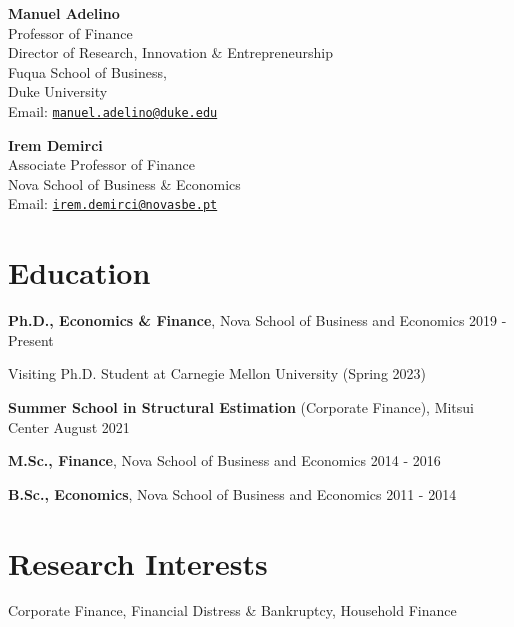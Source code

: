 \documentclass[letterpaper]{article}
\newenvironment{itemize*}{
  \begin{list}{}{
    \setlength{\leftmargin}{1.5em}
  }
}{
  \end{list}
}
\begin{document}
\begin{multicols}{2}
\textbf{Manuel Adelino} \\
Professor of Finance \\
Director of Research, Innovation \& Entrepreneurship \\
Fuqua School of Business, \\ 
Duke University \\
Email: \href{mailto:manuel.adelino@duke.edu}{\tt manuel.adelino@duke.edu} 
\columnbreak \hfill

\textbf{Irem Demirci} \\
Associate Professor of Finance \\ 
Nova School of Business \& Economics \\
Email: \href{mailto:irem.demirci@novasbe.pt}{\tt irem.demirci@novasbe.pt} 
\end{multicols}

\section*{Education}
\vspace{-0.2in}
\hrulefill
\begin{itemize*}
\item \textbf{Ph.D., Economics \& Finance}, Nova School of Business and Economics \hfill 2019 - Present
\item \phantom{aaa} Visiting Ph.D. Student at Carnegie Mellon University (Spring 2023)
\item \textbf{Summer School in Structural Estimation} (Corporate Finance), Mitsui Center \hfill August 2021
\item \textbf{M.Sc., Finance}, Nova School of Business and Economics \hfill 2014 - 2016
\item \textbf{B.Sc., Economics}, Nova School of Business and Economics \hfill  2011 - 2014
\end{itemize*}

\section*{Research Interests}
\vspace{-0.2in}
\hrulefill
\begin{itemize*}
\item Corporate Finance, Financial Distress \& Bankruptcy, Household Finance
\end{itemize*}
\end{document}
